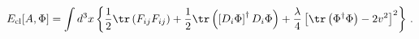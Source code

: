 \begin{equation}
E_{\rm cl}[A,\Phi] =  
\int d^3x \left\{\frac{1}{2} \tr\left(F_{i j}F_{i j}\right) + 
\frac{1}{2}\tr\left(\left[D_{i}\Phi\right]^{\dag} D_{i}\Phi\right) + 
\frac{\lambda}{4}\left[\tr\left(\Phi^{\dag}\Phi\right)-2v^2\right]^2  
\right\} \, . 
\label{Eclassical}
\end{equation}

